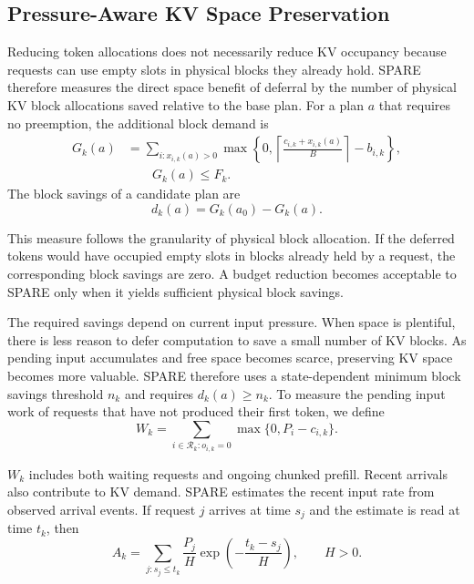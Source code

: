 \documentclass[sigconf,anonymous,review]{acmart}
\begin{document}
\subsection{Pressure-Aware KV Space Preservation}
\label{sec:spare-preservation}

Reducing token allocations does not necessarily reduce KV occupancy because requests can use empty slots in physical blocks they already hold. SPARE therefore measures the direct space benefit of deferral by the number of physical KV block allocations saved relative to the base plan. For a plan $a$ that requires no preemption, the additional block demand is
\begin{equation}
\begin{aligned}
G_k(a)&=\sum_{i:x_{i,k}(a)>0}
\max\!\left\{0,
\left\lceil\frac{c_{i,k}+x_{i,k}(a)}{B}\right\rceil-b_{i,k}
\right\},\\
&\hspace{2em}G_k(a)\le F_k.
\end{aligned}
\tag{7}\label{eq:spare-block-demand}
\end{equation}
The block savings of a candidate plan are
\begin{equation}
d_k(a)=G_k(a_0)-G_k(a).
\tag{8}\label{eq:spare-block-savings}
\end{equation}

This measure follows the granularity of physical block allocation. If the deferred tokens would have occupied empty slots in blocks already held by a request, the corresponding block savings are zero. A budget reduction becomes acceptable to SPARE only when it yields sufficient physical block savings.

The required savings depend on current input pressure. When space is plentiful, there is less reason to defer computation to save a small number of KV blocks. As pending input accumulates and free space becomes scarce, preserving KV space becomes more valuable. SPARE therefore uses a state-dependent minimum block savings threshold $n_k$ and requires $d_k(a)\ge n_k$. To measure the pending input work of requests that have not produced their first token, we define
\begin{equation}
W_k=\sum_{i\in\mathcal R_k:o_{i,k}=0}
\max\{0,P_i-c_{i,k}\}.
\tag{9}\label{eq:spare-pending-work}
\end{equation}

$W_k$ includes both waiting requests and ongoing chunked prefill. Recent arrivals also contribute to KV demand. SPARE estimates the recent input rate from observed arrival events. If request $j$ arrives at time $s_j$ and the estimate is read at time $t_k$, then
\begin{equation}
A_k=\sum_{j:s_j\le t_k}\frac{P_j}{H}
\exp\!\left(-\frac{t_k-s_j}{H}\right),\qquad H>0.
\tag{10}\label{eq:spare-arrival-rate}
\end{equation}
\end{document}
